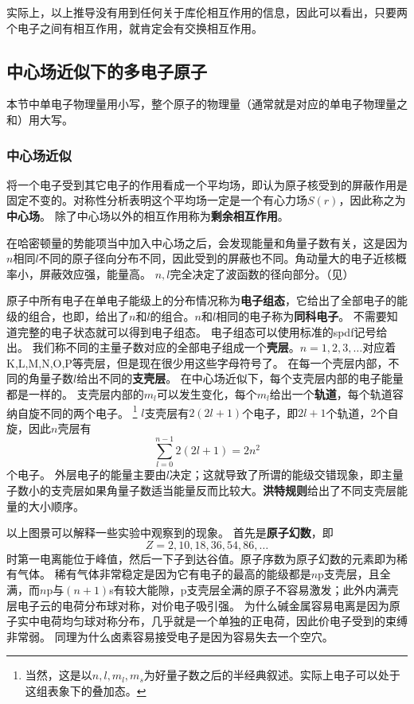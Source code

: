\documentclass[UTF8, a4paper]{ctexart}
\renewcommand{\autoref}{\prettyref}
\begin{document}
实际上，以上推导没有用到任何关于库伦相互作用的信息，因此可以看出，只要两个电子之间有相互作用，就肯定会有交换相互作用。

\subsection{中心场近似下的多电子原子}

本节中单电子物理量用小写，整个原子的物理量（通常就是对应的单电子物理量之和）用大写。

\subsubsection{中心场近似}\label{sec:centric-field}

将一个电子受到其它电子的作用看成一个平均场，即认为原子核受到的屏蔽作用是固定不变的。对称性分析表明这个平均场一定是一个有心力场$S(r)$，因此称之为\textbf{中心场}。
除了中心场以外的相互作用称为\textbf{剩余相互作用}。

在哈密顿量的势能项当中加入中心场之后，会发现能量和角量子数有关，这是因为$n$相同$l$不同的原子径向分布不同，因此受到的屏蔽也不同。角动量大的电子近核概率小，屏蔽效应强，能量高。
$n, l$完全决定了波函数的径向部分。（见\autoref{sec:quantum-number}）

原子中所有电子在单电子能级上的分布情况称为\textbf{电子组态}，它给出了全部电子的能级的组合，也即，给出了$n$和$l$的组合。$n$和$l$相同的电子称为\textbf{同科电子}。
不需要知道完整的电子状态就可以得到电子组态。
电子组态可以使用标准的spdf记号给出。
我们称不同的主量子数对应的全部电子组成一个\textbf{壳层}。$n=1, 2, 3, \ldots$对应着K,L,M,N,O,P等壳层，但是现在很少用这些字母符号了。
在每一个壳层内部，不同的角量子数$l$给出不同的\textbf{支壳层}。
在中心场近似下，每个支壳层内部的电子能量都是一样的。
支壳层内部的$m_l$可以发生变化，每个$m_l$给出一个\textbf{轨道}，每个轨道容纳自旋不同的两个电子。%
\footnote{当然，这是以$n,l,m_l,m_s$为好量子数之后的半经典叙述。实际上电子可以处于这组表象下的叠加态。}%
$l$支壳层有$2(2l+1)$个电子，即$2l+1$个轨道，$2$个自旋，因此$n$壳层有
\[
    \sum_{l=0}^{n-1} 2(2l+1) = 2n^2
\]
个电子。
外层电子的能量主要由$l$决定；这就导致了所谓的能级交错现象，即主量子数小的支壳层如果角量子数适当能量反而比较大。\textbf{洪特规则}给出了不同支壳层能量的大小顺序。

以上图景可以解释一些实验中观察到的现象。
首先是\textbf{原子幻数}，即
\[
    Z=2, 10, 18, 36, 54, 86, \ldots
\]
时第一电离能位于峰值，然后一下子到达谷值。原子序数为原子幻数的元素即为稀有气体。
稀有气体非常稳定是因为它有电子的最高的能级都是$n$p支壳层，且全满，而$n$p与$(n+1)$s有较大能隙，p支壳层全满的原子不容易激发；此外内满壳层电子云的电荷分布球对称，对价电子吸引强。
为什么碱金属容易电离是因为原子实中电荷均匀球对称分布，几乎就是一个单独的正电荷，因此价电子受到的束缚非常弱。
同理为什么卤素容易接受电子是因为容易失去一个空穴。
\end{document}
